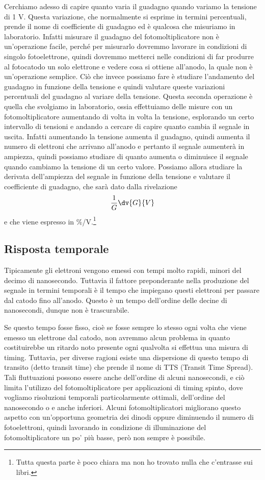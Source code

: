 \vspace{0.2cm}Cerchiamo adesso di capire quanto varia il guadagno quando variamo la tensione di 1 V. Questa variazione, che normalmente si esprime in termini percentuali, prende il nome di coefficiente di guadagno ed è qualcosa che misuriamo in laboratorio. Infatti misurare il guadagno del fotomoltiplicatore non è un'operazione facile, perché per misurarlo dovremmo lavorare in condizioni di singolo fotoelettrone, quindi dovremmo metterci nelle condizioni di far produrre al fotocatodo un solo elettrone e vedere cosa si ottiene all'anodo, la quale non è un'operazione semplice. Ciò che invece possiamo fare è studiare l'andamento del guadagno in funzione della tensione e quindi valutare queste variazioni percentuali del guadagno al variare della tensione. Questa seconda operazione è quella che svolgiamo in laboratorio, ossia effettuiamo delle misure con un fotomoltiplicatore aumentando di volta in volta la tensione, esplorando un certo intervallo di tensioni e andando a cercare di capire quanto cambia il segnale in uscita. Infatti aumentando la tensione aumenta il guadagno, quindi aumenta il numero di elettroni che arrivano all'anodo e pertanto il segnale aumenterà in ampiezza, quindi possiamo studiare di quanto aumenta o diminuisce il segnale quando cambiamo la tensione di un certo valore. Possiamo allora studiare la derivata dell'ampiezza del segnale in funzione della tensione e valutare il coefficiente di guadagno, che sarà dato dalla rivelazione
\begin{equation*}
   \frac{1}{G}\dv{G}{V}
\end{equation*}
e che viene espresso in \%/V.\footnote{Tutta questa parte è poco chiara ma non ho trovato nulla che c'entrasse sui libri.}

\subsection{Risposta temporale}
Tipicamente gli elettroni vengono emessi con tempi molto rapidi, minori del decimo di nanosecondo. Tuttavia il fattore preponderante nella produzione del segnale in termini temporali è il tempo che impiegano questi elettroni per passare dal catodo fino all'anodo. Questo è un tempo dell'ordine delle decine di nanosecondi, dunque non è trascurabile.

Se questo tempo fosse fisso, cioè se fosse sempre lo stesso ogni volta che viene emesso un elettrone dal catodo, non avremmo alcun problema in quanto costituirebbe un ritardo noto presente ogni qualvolta si effettua una misura di timing. Tuttavia, per diverse ragioni esiste una dispersione di questo tempo di transito (detto transit time) che prende il nome di TTS (Transit Time Spread). Tali fluttuazioni possono essere anche dell'ordine di alcuni nanosecondi, e ciò limita l'utilizzo del fotomoltiplicatore per applicazioni di timing spinto, dove vogliamo risoluzioni temporali particolarmente ottimali, dell'ordine del nanosecondo o e anche inferiori. Alcuni fotomoltiplicatori migliorano questo aspetto con un'opportuna geometria dei dinodi oppure diminuendo il numero di fotoelettroni, quindi lavorando in condizione di illuminazione del fotomoltiplicatore un po' più basse, però non sempre è possibile. 

